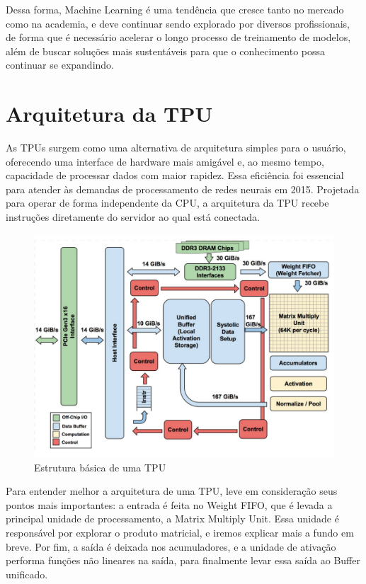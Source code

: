 \documentclass{report}
\begin{document}
Dessa forma, Machine Learning é uma tendência que cresce tanto no mercado como na academia, e deve continuar sendo explorado por diversos profissionais, de forma que é necessário acelerar o longo processo de treinamento de modelos, além de buscar soluções mais sustentáveis para que o conhecimento possa continuar se expandindo.


\chapter{Arquitetura da TPU}

As TPUs surgem como uma alternativa de arquitetura simples para o usuário, oferecendo uma interface de hardware mais amigável e, ao mesmo tempo, capacidade de processar dados com maior rapidez. Essa eficiência foi essencial para atender às demandas de processamento de redes neurais em 2015. Projetada para operar de forma independente da CPU, a arquitetura da TPU recebe instruções diretamente do servidor ao qual está conectada.

\begin{figure}[h]
	\includegraphics[scale=0.7]{tpu-block-diagram}
	\centering
	\caption{Estrutura básica de uma TPU}
\end{figure}

Para entender melhor a arquitetura de uma TPU, leve em consideração seus pontos mais importantes: a entrada é feita no Weight FIFO, que é levada a principal unidade de processamento, a Matrix Multiply Unit. Essa unidade é responsável por explorar o produto matricial, e iremos explicar mais a fundo em breve. Por fim, a saída é deixada nos acumuladores, e a unidade de ativação performa funções não lineares na saída, para finalmente levar essa saída ao Buffer unificado.
\end{document}
